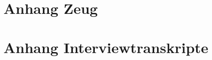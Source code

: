 \documentclass[%
draft=false,%
paper=a4,%
fontsize=12pt,%
pagesize=auto,%
twoside=false,%
headings=small,openany,%
chapterprefix=false,%
version=last,%
titlepage=true,%
parskip=half+,%
mpinclude=false,%
headsepline=true,%
numbers=noendperiod%
]{scrbook}
\renewcommand*{\chapterpagestyle}{scrheadings}
\begin{document}
\clearplainofpairofpagestyles
\pagestyle{scrheadings}
\renewcommand*{\chapterpagestyle}{scrheadings}
\normalsize
\cleardoublepage

%


\cleardoublepage
\tableofcontents
\listoffigures
\listoftables


\setlength{\skip\footins}{2em}		%


\mainmatter







\chapter{Anhang Zeug}
\nocite{*}
\printbibliography


\appendix
\chapter{Anhang Interviewtranskripte}

%

\end{document}
